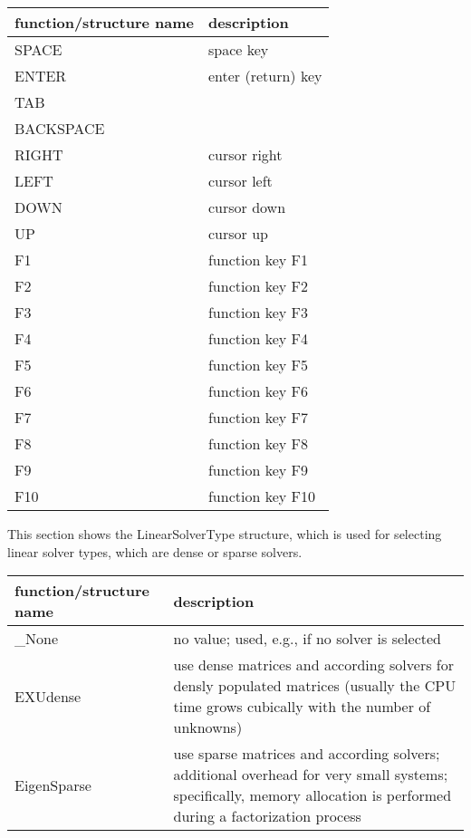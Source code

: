 \begin{center}
\footnotesize
\begin{longtable}{| p{8cm} | p{8cm} |} 
\hline
{\bf function/structure name} & {\bf description}\\ \hline
  SPACE & space key\\ \hline 
  ENTER & enter (return) key\\ \hline 
  TAB & \\ \hline 
  BACKSPACE & \\ \hline 
  RIGHT & cursor right\\ \hline 
  LEFT & cursor left\\ \hline 
  DOWN & cursor down\\ \hline 
  UP & cursor up\\ \hline 
  F1 & function key F1\\ \hline 
  F2 & function key F2\\ \hline 
  F3 & function key F3\\ \hline 
  F4 & function key F4\\ \hline 
  F5 & function key F5\\ \hline 
  F6 & function key F6\\ \hline 
  F7 & function key F7\\ \hline 
  F8 & function key F8\\ \hline 
  F9 & function key F9\\ \hline 
  F10 & function key F10\\ \hline 
\end{longtable}
\end{center}

\label{sec:LinearSolverType}
This section shows the LinearSolverType structure, which is used for selecting linear solver types, which are dense or sparse solvers.



\begin{center}
\footnotesize
\begin{longtable}{| p{8cm} | p{8cm} |} 
\hline
{\bf function/structure name} & {\bf description}\\ \hline
  \_None & no value; used, e.g., if no solver is selected\\ \hline 
  EXUdense & use dense matrices and according solvers for densly populated matrices (usually the CPU time grows cubically with the number of unknowns)\\ \hline 
  EigenSparse & use sparse matrices and according solvers; additional overhead for very small systems; specifically, memory allocation is performed during a factorization process\\ \hline 
\end{longtable}
\end{center}
